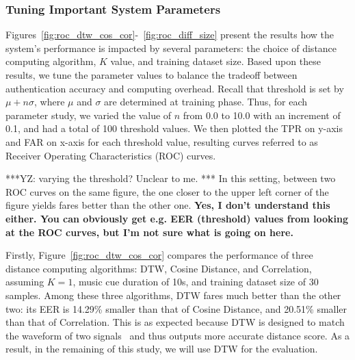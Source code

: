 \subsubsection{Tuning Important System Parameters}
Figures~\ref{fig:roc_dtw_cos_cor}-~\ref{fig:roc_diff_size} present the results how the system's performance is impacted by several parameters: the choice of distance computing algorithm, $K$ value, and training dataset size.
Based upon these results, we tune the parameter values to balance the tradeoff between authentication accuracy and computing overhead. Recall that threshold is set by $\mu+n\sigma$, where $\mu$ and $\sigma$ are determined at training phase. Thus, for each parameter study, we varied the value of $n$ from 0.0 to 10.0 with an increment of 0.1, and had a total of 100 threshold values. We then plotted the TPR  on y-axis and FAR on x-axis for each threshold value,  resulting curves referred to as Receiver Operating Characteristics (ROC) curves. %
 
***YZ: varying the threshold? Unclear to me. *** In this setting, between two ROC curves on the same figure, the one closer to the upper left corner of the figure yields fares better than the other one. \textbf{Yes, I don't understand this either. You can obviously get e.g. EER (threshold) values from looking at the ROC curves, but I'm not sure what is going on here.}

Firstly, Figure~\ref{fig:roc_dtw_cos_cor} compares the performance of three distance computing algorithms: DTW, Cosine Distance, and Correlation, assuming $K=1$, music cue duration of 10s, and training dataset size of 30 samples.  Among these three algorithms, DTW fares much better than the other two: its EER is 14.29\% smaller than that of Cosine Distance, and 20.51\% smaller than that of Correlation. This is as expected because DTW is designed to match the waveform of two signals~\cite{dtw} and thus outputs more accurate distance score. As a result, in the remaining of this study, we will use DTW for the evaluation.


